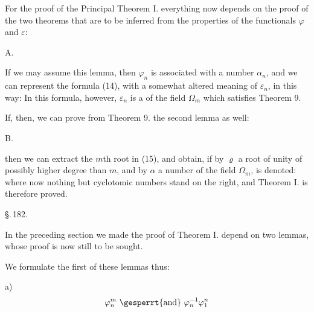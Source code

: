 
For the proof of the Principal Theorem I. everything now depends on
the proof of the two theorems that are to be inferred from the
properties of the functionals $\varphi$ and $\varepsilon$:

A. 

If we may assume this lemma, then $\varphi_n$ is associated with a
number $\alpha_n$, and we can represent the formula (14), with a
somewhat altered meaning of $\varepsilon_n$, in this
way:
In this formula, however, $\varepsilon_n$ is a 
of the field $\Omega_m$ which satisfies Theorem 9.

If, then, we can prove from Theorem 9. the second lemma as
well:

B. 

then we can extract the $m$th root in (15), and obtain, if by
$\varrho$ a root of unity of possibly higher degree than $m$,
and by $\alpha$ a number of the field $\Omega_m$, is denoted:
where now nothing but cyclotomic numbers stand on the right, and
Theorem I. is therefore proved.

\begin{center}
\S.\,182.

\end{center}

In the preceding section we made the proof of Theorem I. depend
on two lemmas, whose proof is now still to be sought.

We formulate the first of these lemmas thus:

a) 
\[
\varphi_n^m \text{ \gesperrt{and} } \varphi_n^{-1} \varphi_1^n
\]
